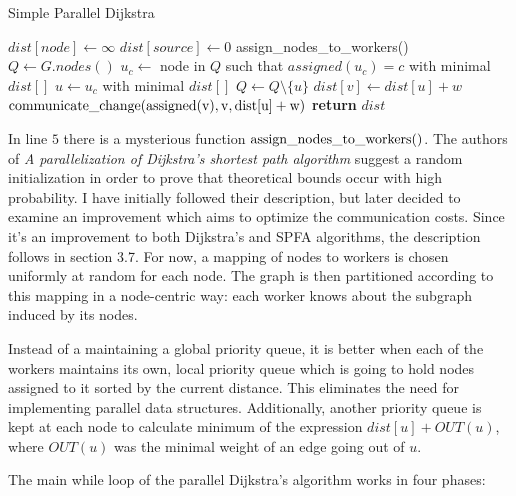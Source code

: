 \documentclass[12pt,a4paper,twoside,openright]{report}
\begin{document}
\begin{algorithm}
\caption{Simple Parallel Dijkstra}\label{pdijkstraagain}
\begin{algorithmic}[1]
    \State $dist[node] \gets \infty$
\EndFor
\State $dist[source] \gets 0$
\State \rm{assign\_nodes\_to\_workers()}
\State $Q \gets G.nodes()$
        \State $u_c \gets$ node in $Q$ such that $assigned(u_c) = c$ with minimal $dist[]$
        \EndFor
        \State $u \gets u_c$ with minimal $dist[]$
        \State $Q \gets Q \setminus \{u\}$
            \State $dist[v] \gets dist[u] + w$
            \State $\rm{communicate\_change(assigned(v)}, v, dist[u] + w)$
        \EndIf
      \EndFor
    \EndWhile
\State \textbf{return} $dist$
\EndProcedure
\end{algorithmic}
\end{algorithm}

In line $5$ there is a mysterious function $\rm{assign\_nodes\_to\_workers()}$. The authors of \textit{A parallelization of Dijkstra's shortest path algorithm} \cite{dijkstra} suggest a random initialization in order to prove that theoretical bounds occur with high probability. I have initially followed their description, but later decided to examine an improvement which aims to optimize the communication costs. Since it's an improvement to both Dijkstra's and SPFA algorithms, the description follows in section 3.7. For now, a mapping of nodes to workers is chosen uniformly at random for each node. The graph is then partitioned according to this mapping in a node-centric way: each worker knows about the subgraph induced by its nodes.

Instead of a maintaining a global priority queue, it is better when each of the workers maintains its own, local priority queue which is going to hold nodes assigned to it sorted by the current distance. This eliminates the need for implementing parallel data structures. Additionally, another priority queue is kept at each node to calculate minimum of the expression $dist[u] + OUT(u)$, where $OUT(u)$ was the minimal weight of an edge going out of $u$. 

The main while loop of the parallel Dijkstra's algorithm works in four phases:
\end{document}
